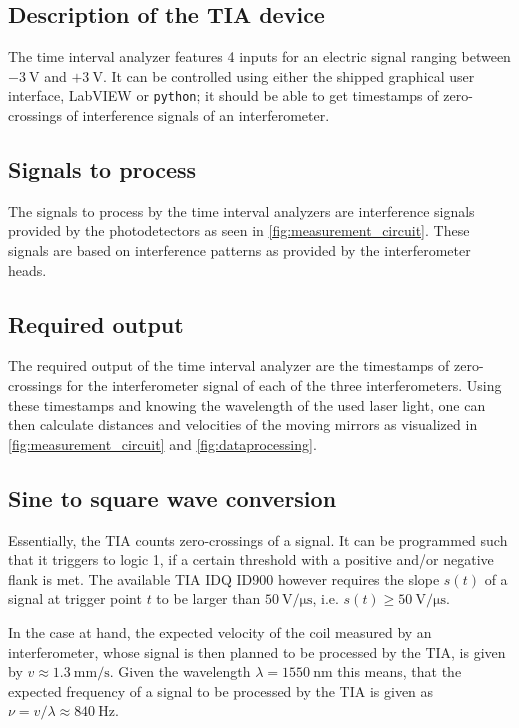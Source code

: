 \documentclass{report}
\numberwithin{tm}{section}
\begin{document}
\subsection{Description of the TIA device}
The time interval analyzer features 4 inputs for an electric signal ranging between $-\SI{3}{\volt}$ and $+\SI{3}{\volt}$. It can be controlled using either the shipped graphical user interface, LabVIEW or \verb|python|; it should be able to get timestamps of zero-crossings of interference signals of an interferometer.

\subsection{Signals to process}
The signals to process by the time interval analyzers are interference signals provided by the photodetectors as seen in \cref{fig:measurement_circuit}. These signals are based on interference patterns as provided by the interferometer heads.

\subsection{Required output}
The required output of the time interval analyzer are the timestamps of zero-crossings for the interferometer signal of each of the three interferometers. Using these timestamps and knowing the wavelength of the used laser light, one can then calculate distances and velocities of the moving mirrors as visualized in \cref{fig:measurement_circuit} and \cref{fig:dataprocessing}.

\subsection{Sine to square wave conversion}
Essentially, the TIA counts zero-crossings of a signal. It can be programmed such that it triggers to logic 1, if a certain threshold with a positive and/or negative flank is met. The available TIA IDQ ID900 however requires the slope $s(t)$ of a signal at trigger point $t$ to be larger than $\SI{50}{\volt\per\micro\second}$, i.e. $s(t) \geq \SI{50}{\volt\per\micro\second}$.

In the case at hand, the expected velocity of the coil measured by an interferometer, whose signal is then planned to be processed by the TIA, is given by $v \approx \SI{1.3}{\milli\meter\per\second}$. Given the wavelength $\lambda = \SI{1550}{\nano\meter}$ this means, that the expected frequency of a signal to be processed by the TIA is given as $\nu = v/\lambda \approx \SI{840}{\hertz}$.
\end{document}
